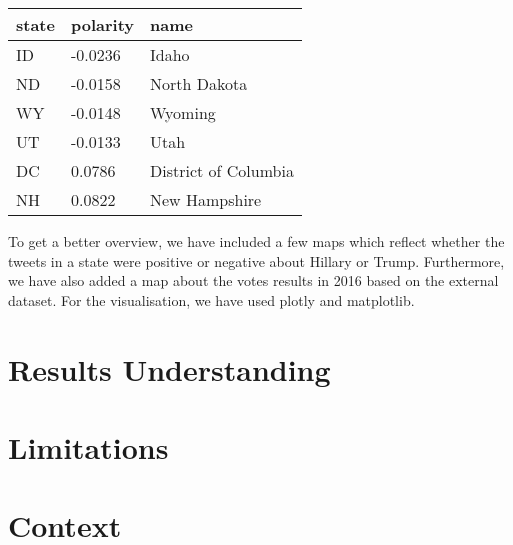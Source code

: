 \documentclass{article}
\begin{document}
  \begin{table}[H]
    \centering
    \begin{tabular}{||p{2cm} p{3cm} p{3cm}||}
      \hline
      state & polarity & name \\ \hline
      ID & -0.0236 & Idaho \\
      ND & -0.0158 & North Dakota \\
      WY & -0.0148 & Wyoming \\
      UT & -0.0133 & Utah \\
      DC & 0.0786 & District of Columbia \\
      NH & 0.0822 & New Hampshire\\
      \hline
    \end{tabular}
    \caption{\label{tab:} }
  \end{table}

  To get a better overview, we have included a few maps which reflect
  whether the tweets in a state were positive or negative about
  Hillary or Trump. Furthermore, we have also added a map about the
  votes results in 2016 based on the external dataset. For the
  visualisation, we have used plotly and matplotlib.  
  
  \section{Results Understanding}
  \section{Limitations}
  \section{Context}
\end{document}
